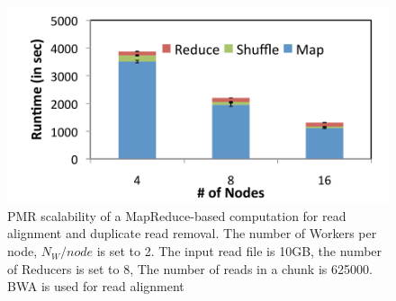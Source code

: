 \documentclass{acm_proc_article-sp}
\begin{document}


\begin{figure}
 \centering
\includegraphics[scale=0.50]{figures/pj-smr-scale.pdf}
\caption{\small PMR scalability of a MapReduce-based computation for
  read alignment and duplicate read removal.  The number of Workers
  per node, $N_{W}/node$ is set to 2.  The input read file is 10GB,
  the number of Reducers is set to 8, The number of reads in a chunk
  is 625000. BWA is used for read alignment}
  \label{fig:scale-p-saga-mr} 
\end{figure}
\end{document}
